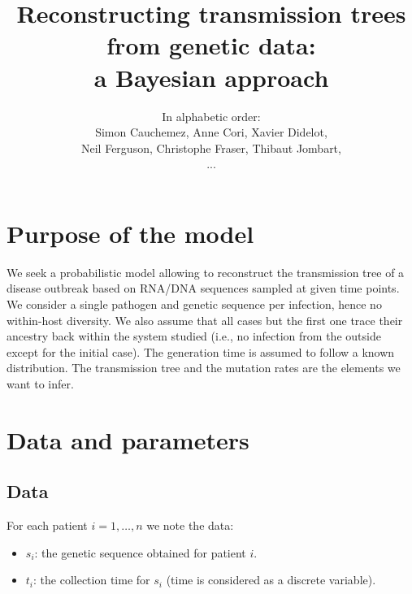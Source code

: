 \documentclass[10pt]{article}
\author{In alphabetic order: \\Simon Cauchemez, Anne Cori, Xavier Didelot, \\Neil Ferguson, Christophe Fraser, Thibaut Jombart,\\...}
\title{Reconstructing transmission trees from genetic data: \\a Bayesian approach}
\begin{document}
\maketitle

\section*{Purpose of the model}
We seek a probabilistic model allowing to reconstruct the transmission tree of a disease outbreak based on RNA/DNA sequences sampled at given time points.
We consider a single pathogen and genetic sequence per infection, hence no within-host diversity.
We also assume that all cases but the first one trace their ancestry back within the system studied (i.e., no infection from the outside except for the initial case).
The generation time is assumed to follow a known distribution.
The transmission tree and the mutation rates are the elements we want to infer.



\section*{Data and parameters}

\subsection*{Data}
For each patient $i=1,\ldots,n$ we note the data:
\begin{itemize}
	\item $s_i$: the genetic sequence obtained for patient $i$.
	\item $t_i$: the collection time for $s_i$ (time is considered as a discrete variable).
\end{itemize}
\end{document}
